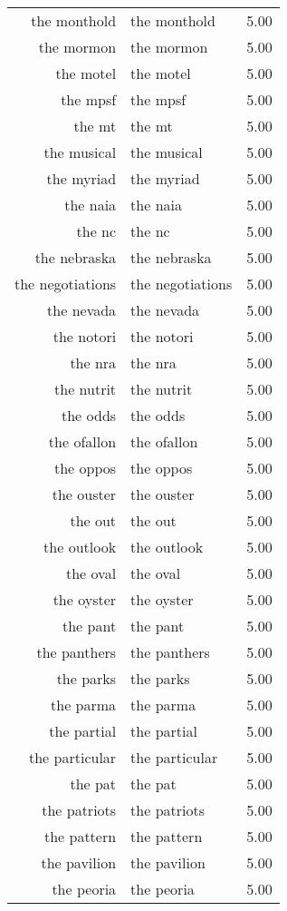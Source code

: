 \begin{table}[ht]
\begin{tabular}{rlr}
  the monthold & the monthold & 5.00 \\ 
  the mormon & the mormon & 5.00 \\ 
  the motel & the motel & 5.00 \\ 
  the mpsf & the mpsf & 5.00 \\ 
  the mt & the mt & 5.00 \\ 
  the musical & the musical & 5.00 \\ 
  the myriad & the myriad & 5.00 \\ 
  the naia & the naia & 5.00 \\ 
  the nc & the nc & 5.00 \\ 
  the nebraska & the nebraska & 5.00 \\ 
  the negotiations & the negotiations & 5.00 \\ 
  the nevada & the nevada & 5.00 \\ 
  the notori & the notori & 5.00 \\ 
  the nra & the nra & 5.00 \\ 
  the nutrit & the nutrit & 5.00 \\ 
  the odds & the odds & 5.00 \\ 
  the ofallon & the ofallon & 5.00 \\ 
  the oppos & the oppos & 5.00 \\ 
  the ouster & the ouster & 5.00 \\ 
  the out & the out & 5.00 \\ 
  the outlook & the outlook & 5.00 \\ 
  the oval & the oval & 5.00 \\ 
  the oyster & the oyster & 5.00 \\ 
  the pant & the pant & 5.00 \\ 
  the panthers & the panthers & 5.00 \\ 
  the parks & the parks & 5.00 \\ 
  the parma & the parma & 5.00 \\ 
  the partial & the partial & 5.00 \\ 
  the particular & the particular & 5.00 \\ 
  the pat & the pat & 5.00 \\ 
  the patriots & the patriots & 5.00 \\ 
  the pattern & the pattern & 5.00 \\ 
  the pavilion & the pavilion & 5.00 \\ 
  the peoria & the peoria & 5.00 \\ 

\end{tabular}
\end{table}
